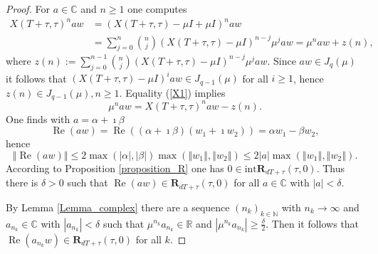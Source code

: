 \documentclass{siamltex}%
\begin{document}
\begin{proof}
For $a\in\mathbb{C}$ and $n\geq1$ one computes%
\begin{align}
X(T+\tau,\tau)^{n}aw  &  =(X(T+\tau,\tau)-\mu I+\mu I)^{n}aw\nonumber\\
&  =\sum_{j=0}^{n}{\binom{n}{j}}(X(T+\tau,\tau)-\mu I)^{n-j}\mu^{j}aw=\mu
^{n}aw+z(n), \label{X1}%
\end{align}
where $z(n):=\sum_{j=0}^{n-1}{\binom{n}{j}}(X(T+\tau,\tau)-\mu I)^{n-j}\mu
^{j}aw$. Since $aw\in J_{q}(\mu)$ it follows that $(X(T+\tau,\tau)-\mu
I)^{i}aw\in J_{q-1}(\mu)$ for all $i\geq1$, hence $z(n)\in J_{q-1}(\mu
),n\geq1$. Equality (\ref{X1}) implies
\begin{equation}
\mu^{n}aw=X(T+\tau,\tau)^{n}aw-z(n). \label{3.1}%
\end{equation}
One finds with $a=\alpha+\imath\beta$%
\[
\operatorname{Re}(aw)=\operatorname{Re}((\alpha+\imath\beta)(w_{1}+\imath
w_{2}))=\alpha w_{1}-\beta w_{2},
\]
hence%
\[
\left\Vert \operatorname{Re}(aw)\right\Vert \leq2\max(\left\vert
\alpha\right\vert ,\left\vert \beta\right\vert )\max(\left\Vert w_{1}%
\right\Vert ,\left\Vert w_{2}\right\Vert )\leq2\left\vert a\right\vert
\max(\left\Vert w_{1}\right\Vert ,\left\Vert w_{2}\right\Vert ).
\]
According to Proposition \ref{proposition_R} one has $0\in\mathrm{int}%
\mathbf{R}_{dT+\tau}(\tau,0)$. Thus there is $\delta>0$ such that
$\operatorname{Re}(aw)\in\mathbf{R}_{dT+\tau}(\tau,0)$ for all $a\in
\mathbb{C}$ with $\left\vert a\right\vert <\delta$.

By Lemma \ref{Lemma_complex} there are a sequence $(n_{k})_{k\in\mathbb{N}}$
with $n_{k}\rightarrow\infty$ and $a_{n_{k}}\in\mathbb{C}$ with $\left\vert
a_{n_{k}}\right\vert <\delta$ such that $\mu^{n_{k}}a_{n_{k}}\in\mathbb{R}$
and $\left\vert \mu^{n_{k}}a_{n_{k}}\right\vert \geq\frac{\delta}{2}$. Then it
follows that $\operatorname{Re}(a_{n_{k}}w)\in\mathbf{R}_{dT+\tau}(\tau,0)$
for all $k$.


\end{proof}
\end{document}
